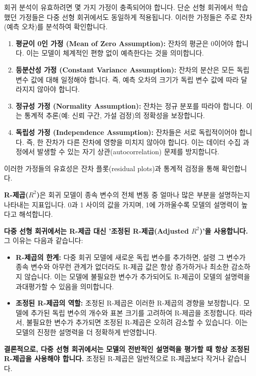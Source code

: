 \documentclass[11pt,a4paper]{article}
\theoremstyle{definition}
\begin{document}
\begin{tcolorbox}[title=\textbf{회귀 모델의 가정 (Regression Model Assumptions)}]
회귀 분석이 유효하려면 몇 가지 가정이 충족되어야 합니다. 단순 선형 회귀에서 학습했던 가정들은 다중 선형 회귀에서도 동일하게 적용됩니다. 이러한 가정들은 주로 잔차(예측 오차)를 분석하여 확인합니다.

\begin{enumerate}
    \item \textbf{평균이 0인 가정 (Mean of Zero Assumption):} 잔차의 평균은 0이어야 합니다. 이는 모델이 체계적인 편향 없이 예측한다는 것을 의미합니다.
    \item \textbf{등분산성 가정 (Constant Variance Assumption):} 잔차의 분산은 모든 독립 변수 값에 대해 일정해야 합니다. 즉, 예측 오차의 크기가 독립 변수 값에 따라 달라지지 않아야 합니다.
    \item \textbf{정규성 가정 (Normality Assumption):} 잔차는 정규 분포를 따라야 합니다. 이는 통계적 추론(예: 신뢰 구간, 가설 검정)의 정확성을 보장합니다.
    \item \textbf{독립성 가정 (Independence Assumption):} 잔차들은 서로 독립적이어야 합니다. 즉, 한 잔차가 다른 잔차에 영향을 미치지 않아야 합니다. 이는 데이터 수집 과정에서 발생할 수 있는 자기 상관(autocorrelation) 문제를 방지합니다.
\end{enumerate}
이러한 가정들의 유효성은 잔차 플롯(residual plots)과 통계적 검정을 통해 확인합니다.
\end{tcolorbox}

\begin{tcolorbox}[title=\textbf{R-제곱($R^2$)과 조정된 R-제곱(Adjusted $R^2$)}]
\textbf{R-제곱($R^2$)}은 회귀 모델이 종속 변수의 전체 변동 중 얼마나 많은 부분을 설명하는지 나타내는 지표입니다. 0과 1 사이의 값을 가지며, 1에 가까울수록 모델의 설명력이 높다고 해석합니다.

\textbf{다중 선형 회귀에서는 R-제곱 대신 '조정된 R-제곱(Adjusted $R^2$)'을 사용합니다.}
그 이유는 다음과 같습니다:
\begin{itemize}
    \item \textbf{R-제곱의 한계:} 다중 회귀 모델에 새로운 독립 변수를 추가하면, 설령 그 변수가 종속 변수와 아무런 관계가 없더라도 R-제곱 값은 항상 증가하거나 최소한 감소하지 않습니다. 이는 모델에 불필요한 변수가 추가되어도 R-제곱이 모델의 설명력을 과대평가할 수 있음을 의미합니다.
    \item \textbf{조정된 R-제곱의 역할:} 조정된 R-제곱은 이러한 R-제곱의 경향을 보정합니다. 모델에 추가된 독립 변수의 개수와 표본 크기를 고려하여 R-제곱을 조정합니다. 따라서, 불필요한 변수가 추가되면 조정된 R-제곱은 오히려 감소할 수 있습니다. 이는 모델의 진정한 설명력을 더 정확하게 반영합니다.
\end{itemize}
\textbf{결론적으로, 다중 선형 회귀에서는 모델의 전반적인 설명력을 평가할 때 항상 조정된 R-제곱을 사용해야 합니다.} 조정된 R-제곱은 일반적으로 R-제곱보다 작거나 같습니다.
\end{tcolorbox}
\end{document}
